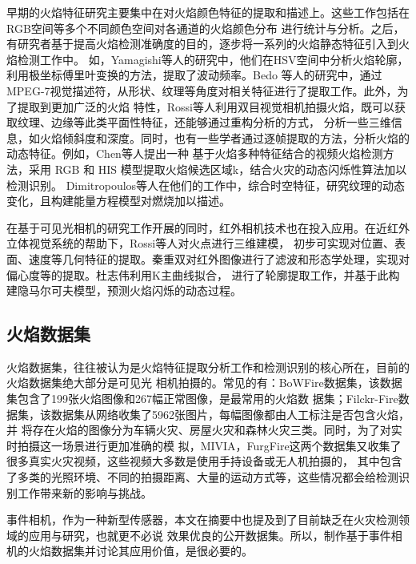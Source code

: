 早期的火焰特征研究主要集中在对火焰颜色特征的提取和描述上。这些工作包括在RGB空间等\cite{chen2004early,marbach2006image,rudz2013investigation}多个不同颜色空间对各通道的火焰颜色分布
进行统计与分析。之后，有研究者基于提高火焰检测准确度的目的，逐步将一系列的火焰静态特征引入到火焰检测工作中。
如，Yamagishi等人\cite{yamagishi2000contour}的研究中，他们在HSV空间中分析火焰轮廓，利用极坐标傅里叶变换的方法，提取了波动频率。Bedo
等人\cite{bedo2015techniques}的研究中，通过MPEG-7视觉描述符，从形状、纹理等角度对相关特征进行了提取工作。此外，为了提取到更加广泛的火焰
特性，Rossi等人\cite{rossi2011use}利用双目视觉相机拍摄火焰，既可以获取纹理、边缘等此类平面性特征，还能够通过重构分析的方式，
分析一些三维信息，如火焰倾斜度和深度。同时，也有一些学者通过逐帧提取的方法，分析火焰的动态特征。例如，Chen等人\cite{2011Application}提出一种
基于火焰多种特征结合的视频火焰检测方法，采用 RGB 和 HIS 模型提取火焰候选区域k，结合火灾的动态闪烁性算法加以检测识别。
Dimitropoulos等人\cite{dimitropoulos2014spatio}在他们的工作中，综合时空特征，研究纹理的动态变化，且构建能量方程模型对燃烧加以描述。

在基于可见光相机的研究工作开展的同时，红外相机技术也在投入应用。在近红外立体视觉系统的帮助下，Rossi等人\cite{rossi2013estimation}对火点进行三维建模，
初步可实现对位置、表面、速度等几何特征的提取。秦重双\cite{qcs}对红外图像进行了滤波和形态学处理，实现对偏心度等的提取。杜志伟\cite{dzw}利用K主曲线拟合，
进行了轮廓提取工作，并基于此构建隐马尔可夫模型，预测火焰闪烁的动态过程。

\subsection{火焰数据集}

火焰数据集，往往被认为是火焰特征提取分析工作和检测识别的核心所在，目前的火焰数据集绝大部分是可见光
相机拍摄的\cite{ko2012wildfire}。常见的有：BoWFire数据集，该数据集包含了199张火焰图像和267幅正常图像，是最常用的火焰数
据集\cite{chino2015bowfire}；Filckr-Fire数据集，该数据集从网络收集了5962张图片，每幅图像都由人工标注是否包含火焰，并
将存在火焰的图像分为车辆火灾、房屋火灾和森林火灾三类\cite{bedo2015techniques}。同时，为了对实时拍摄这一场景进行更加准确的模
拟，MIVIA，FurgFire这两个数据集又收集了很多真实火灾视频，这些视频大多数是使用手持设备或无人机拍摄的，
其中包含了多类的光照环境、不同的拍摄距离、大量的运动方式等，这些情况都会给检测识别工作带来新的影响与挑战。

事件相机，作为一种新型传感器，本文在摘要中也提及到了目前缺乏在火灾检测领域的应用与研究，也就更不必说
效果优良的公开数据集。所以，制作基于事件相机的火焰数据集并讨论其应用价值，是很必要的。

